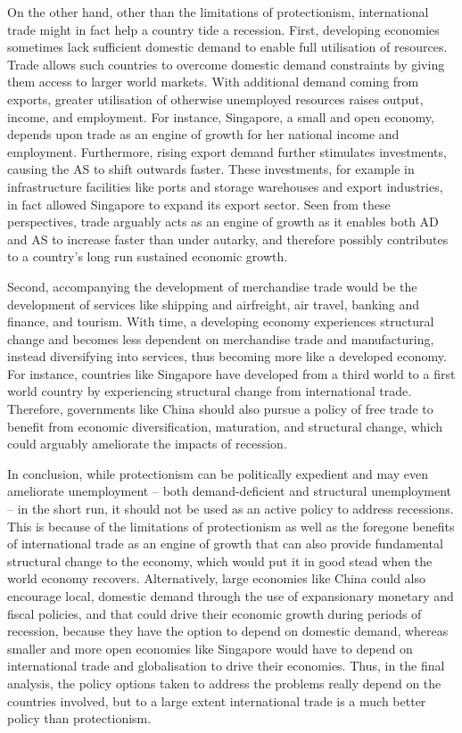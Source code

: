 \documentclass[11pt,a4paper]{article}
\begin{document}
On the other hand, other than the limitations of protectionism, international trade might in fact help a country tide a recession. First, developing economies sometimes lack sufficient domestic demand to enable full utilisation of resources. Trade allows such countries to overcome domestic demand constraints by giving them access to larger world markets. With additional demand coming from exports, greater utilisation of otherwise unemployed resources raises output, income, and employment. For instance, Singapore, a small and open economy, depends upon trade as an engine of growth for her national income and employment. Furthermore, rising export demand further stimulates investments, causing the AS to shift outwards faster. These investments, for example in infrastructure facilities like ports and storage warehouses and export industries, in fact allowed Singapore to expand its export sector. Seen from these perspectives, trade arguably acts as an engine of growth as it enables both AD and AS to increase faster than under autarky, and therefore possibly contributes to a country’s long run sustained economic growth.

Second, accompanying the development of merchandise trade would be the development of services like shipping and airfreight, air travel, banking and finance, and tourism. With time, a developing economy experiences structural change and becomes less dependent on merchandise trade and manufacturing, instead diversifying into services, thus becoming more like a developed economy. For instance, countries like Singapore have developed from a third world to a first world country by experiencing structural change from international trade. Therefore, governments like China should also pursue a policy of free trade to benefit from economic diversification, maturation, and structural change, which could arguably ameliorate the impacts of recession. 

In conclusion, while protectionism can be politically expedient and may even ameliorate unemployment – both demand-deficient and structural unemployment – in the short run, it should not be used as an active policy to address recessions. This is because of the limitations of protectionism as well as the foregone benefits of international trade as an engine of growth that can also provide fundamental structural change to the economy, which would put it in good stead when the world economy recovers. Alternatively, large economies like China could also encourage local, domestic demand through the use of expansionary monetary and fiscal policies, and that could drive their economic growth during periods of recession, because they have the option to depend on domestic demand, whereas smaller and more open economies like Singapore would have to depend on international trade and globalisation to drive their economies. Thus, in the final analysis, the policy options taken to address the problems really depend on the countries involved, but to a large extent international trade is a much better policy than protectionism.
\end{document}
